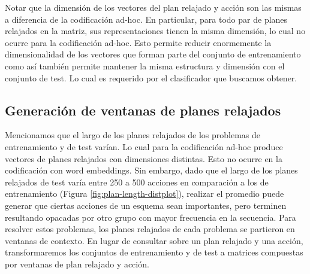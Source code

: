 \begin{table}[h!]
\centering
{}
 \caption{Ejemplos etiquetados a partir de un plan relajado y una acción}
\end{table}

Notar que la dimensión de los vectores del plan relajado y acción son las mismas
a diferencia de la codificación ad-hoc. En particular, para todo par de planes
relajados en la matriz, sus representaciones tienen la misma dimensión, lo cual
no ocurre para la codificación ad-hoc. Esto permite reducir enormemente la
dimensionalidad de los vectores que forman parte del conjunto de entrenamiento
como así también permite mantener la misma estructura y dimensión con el
conjunto de test. Lo cual es requerido por el clasificador que buscamos obtener.

\subsection{Generación de ventanas de planes relajados}

Mencionamos que el largo de los planes relajados de los problemas de
entrenamiento y de test varían. Lo cual para la codificación ad-hoc produce
vectores de planes relajados con dimensiones distintas. Esto no ocurre en la
codificación con word embeddings. Sin embargo, dado que el largo de los planes
relajados de test varía entre 250 a 500 acciones en comparación a los de
entrenamiento (Figura \ref{fig:plan-length-distplot}), realizar el promedio
puede generar que ciertas acciones de un esquema sean importantes, pero terminen
resultando opacadas por otro grupo con mayor frecuencia en la secuencia. Para
resolver estos problemas, los planes relajados de cada problema se partieron en
ventanas de contexto. En lugar de consultar sobre un plan relajado y una acción,
transformaremos los conjuntos de entrenamiento y de test a matrices compuestas por
ventanas de plan relajado y acción.


